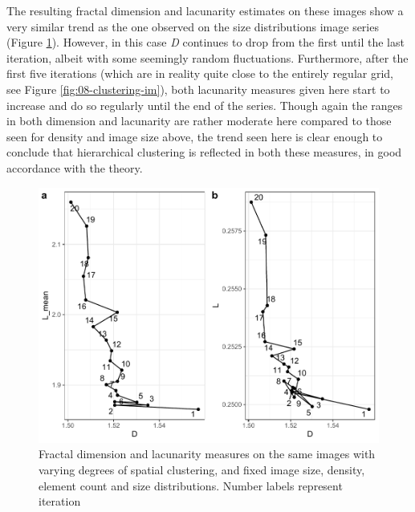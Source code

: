 \documentclass[
  12pt,
]{book}
\begin{document}
The resulting fractal dimension and lacunarity estimates on these images show a very similar trend as the one observed on the size distributions image series (Figure \ref{fig:08-clustering}). However, in this case \emph{D} continues to drop from the first until the last iteration, albeit with some seemingly random fluctuations. Furthermore, after the first five iterations (which are in reality quite close to the entirely regular grid, see Figure \ref{fig:08-clustering-im}), both lacunarity measures given here start to increase and do so regularly until the end of the series. Though again the ranges in both dimension and lacunarity are rather moderate here compared to those seen for density and image size above, the trend seen here is clear enough to conclude that hierarchical clustering is reflected in both these measures, in good accordance with the theory.



\begin{figure}

{\centering \includegraphics[width=0.9\linewidth]{bookdown-demo_files/figure-latex/08-clustering-1} 

}

\caption{Fractal dimension and lacunarity measures on the same images with varying degrees of spatial clustering, and fixed image size, density, element count and size distributions. Number labels represent iteration}\label{fig:08-clustering}
\end{figure}
\end{document}
